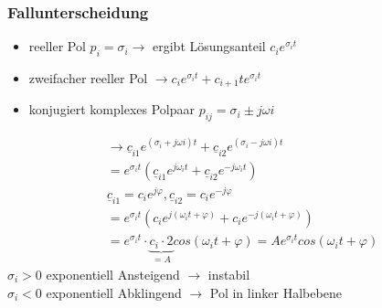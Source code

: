 \subsubsection{Fallunterscheidung}
\begin{itemize}
  \item reeller Pol $p_i=\sigma_i \rightarrow$ ergibt Lösungsanteil
  $c_ie^{\sigma_it}$
  \item zweifacher reeller Pol $\rightarrow
  c_ie^{\sigma_it}+c_{i+1}te^{\sigma_it}$
  \item konjugiert komplexes Polpaar $p_{ij}=\sigma_i\pm j\omega i$
\end{itemize}
\begin{align}
  &\rightarrow \underline{c}_{i1}e^{(\sigma_i+j\omega
  i)t}+\underline{c}_{i2}e^{(\sigma_i-j\omega i)t}\nonumber\\
  &=e^{\sigma_it}\left(\underline{c}_{i1}e^{j\omega_it}+\underline{c}_{i2}e^{-j\omega_it}\right)\nonumber\\
  &\underline{c}_{i1}=c_ie^{j\varphi},
  \underline{c}_{i2}=c_ie^{-j\varphi}\nonumber\\
  &=e^{\sigma_it}\left(c_ie^{j\left(\omega_it+\varphi\right)}+c_ie^{-j\left(\omega_it+\varphi\right)}\right)\nonumber\\
  &=e^{\sigma_it}\cdot
  \underbrace{c_i\cdot2}_{=A}cos(\omega_it+\varphi)=Ae^{\sigma_it}cos(\omega_it+\varphi)\nonumber
\end{align}
$\sigma_i > 0$ exponentiell Ansteigend $\rightarrow$ instabil\\
$\sigma_i < 0$ exponentiell Abklingend $\rightarrow$ Pol in linker Halbebene\\

